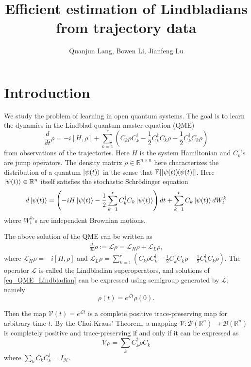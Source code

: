 \documentclass[10pt]{article}  %
\title{Efficient estimation of Lindbladians from trajectory data}
\author{Quanjun Lang, Bowen Li, Jianfeng Lu}
\date{}
\theoremstyle{plain}
\numberwithin{equation}{section}
\def\mH{\mathcal{H}}
\def\mL{\mathcal{L}}
\def\mV{\mathcal{V}}
\def\mB{\mathcal{B}}
\def\R{\mathbb{R}}
\renewcommand{\R}{\mathbb{R}}
\begin{document}
\maketitle

\tableofcontents
\section{Introduction}

We study the problem of learning in open quantum systems. The goal is to learn the dynamics in the Lindblad quantum master equation (QME)
\begin{equation}\label{eq_QME_main}
	\frac{d}{dt} \rho = -i[H, \rho] + \sum_{k = 1}^r (C_k \rho C_k^\dagger - \frac{1}{2} C_k^\dagger C_k \rho - \frac{1}{2} C_k^\dagger C_k \rho)
\end{equation}
from observations of the trajectories. Here $H$ is the system Hamiltonian and $C_k$'s are jump operators. The density matrix $\rho \in \R^{n \times n}$ here characterizes the distribution of a quantum $\ket{\psi(t)}$ in the sense that $\mathbb{E}[\ketbra{\psi(t)}{\psi(t)}]$. 
Here $\ket{\psi(t)} \in \R^n$ itself satisfies the stochastic Schr\"{o}dinger equation
\begin{equation}
	d \ket{\psi(t)} = \left( -i H \ket{\psi(t)} - \frac{1}{2}\sum_{k = 1}^r C_k^\dagger C_k \ket{\psi(t)}\right) dt + \sum_{k = 1}^r C_k \ket{\psi(t)} dW^k_t
\end{equation}
where $W^k_t$'s are independent Brownian motions.


The above solution of the QME can be written as
\begin{align}\label{eq_QME_Lindbladian}
	\frac{d}{dt} \rho := \mL \rho =  \mL_H\rho + \mL_L \rho, 
\end{align}
where $\mL_H \rho = -i[H, \rho]$ and $\mL_L \rho = \sum_{k = 1}^r (C_k \rho C_k^\dagger - \frac{1}{2} C_k^\dagger C_k \rho - \frac{1}{2} C_k^\dagger C_k \rho)$. The operator $\mL$ is called the Lindbladian superoperators, and solutions of \eqref{eq_QME_Lindbladian} can be expressed using semigroup generated by $\mL$, namely
\begin{equation}
	\rho(t) = e^{\mL t}\rho(0).
\end{equation}

Then the map $\mV(t) = e^{\mL t}$ is a complete positive trace-preserving map for arbitrary time $t$. By the Choi-Kraus' Theorem, a mapping $\mV:\mB(\R^n) \to \mB(\R^n)$ is completely positive and trace-preserving if and only if it can be expressed as 
\begin{equation}
	\mV\rho = \sum_{k}C_k^\dagger \rho C_k
\end{equation}
where $\sum_{k}C_kC_k^\dagger = I_\mH$. 
\end{document}
